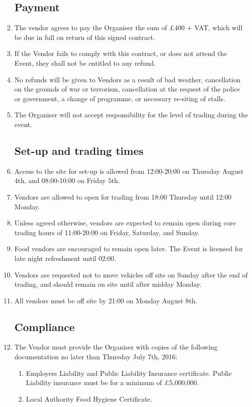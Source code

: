 \begin{enumerate}

\subsection*{Payment}
\item The vendor agrees to pay the Organiser the sum of £400 + VAT, which will be due in
      full on return of this signed contract.
\item If the Vendor fails to comply with this contract, or does not attend the Event,
        they shall not be entitled to any refund.
\item No refunds will be given to Vendors as a result of bad weather, cancellation on the
        grounds of war or terrorism, cancellation at the request of the police or government,
        a change of programme, or necessary re-siting of stalls.
\item The Organiser will not accept responsibility for the level of trading during the event.

\subsection*{Set-up and trading times}
\item Access to the site for set-up is allowed from 12:00-20:00 on Thursday August 4th, and
        08:00-10:00 on Friday 5th.
\item Vendors are allowed to open for trading from 18:00 Thursday until 12:00 Monday.
\item Unless agreed otherwise, vendors are expected to remain open during core trading
        hours of 11:00-20:00 on Friday, Saturday, and Sunday.
\item Food vendors are encouraged to remain open later. The Event is licensed for late
        night refreshment until 02:00.
\item Vendors are requested not to move vehicles off site on Sunday after the end of
        trading, and should remain on site until after midday Monday.
\item All vendors must be off site by 21:00 on Monday August 8th.

\subsection*{Compliance}
\item The Vendor must provide the Organiser with copies of the following documentation no later
        than Thursday July 7th, 2016:
\begin{enumerate}
    \item Employers Liability and Public Liability Insurance certificate.
            Public Liability insurance must be for a minimum of £5,000,000.
    \item Local Authority Food Hygiene Certificate.
\end{enumerate}


\end{enumerate}
